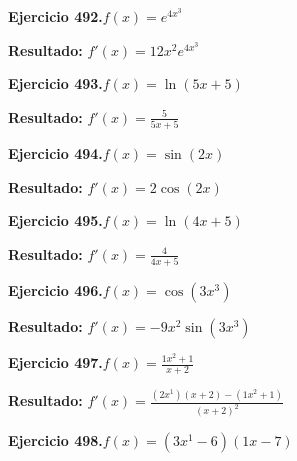 \documentclass[10pt,a4paper]{article}
\begin{document}
\begin{ejbox}
\textbf{Ejercicio 492.}\quad $f(x) = e^{4x^{3}}$
\end{ejbox}

\begin{solbox}
\textbf{Resultado:} \(\displaystyle f'(x) = 12x^{2}e^{4x^{3}}\)
\end{solbox}

\newpage
\begin{ejbox}
\textbf{Ejercicio 493.}\quad $f(x) = \ln(5x + 5)$
\end{ejbox}

\begin{solbox}
\textbf{Resultado:} \(\displaystyle f'(x) = \frac{5}{5x + 5}\)
\end{solbox}

\begin{ejbox}
\textbf{Ejercicio 494.}\quad $f(x) = \sin(2x)$
\end{ejbox}

\begin{solbox}
\textbf{Resultado:} \(\displaystyle f'(x) = 2\cos(2x)\)
\end{solbox}

\begin{ejbox}
\textbf{Ejercicio 495.}\quad $f(x) = \ln(4x + 5)$
\end{ejbox}

\begin{solbox}
\textbf{Resultado:} \(\displaystyle f'(x) = \frac{4}{4x + 5}\)
\end{solbox}

\newpage
\begin{ejbox}
\textbf{Ejercicio 496.}\quad $f(x) = \cos(3x^{3})$
\end{ejbox}

\begin{solbox}
\textbf{Resultado:} \(\displaystyle f'(x) = -9x^{2}\sin(3x^{3})\)
\end{solbox}

\begin{ejbox}
\textbf{Ejercicio 497.}\quad $f(x) = \frac{1x^{2} +1}{x + 2}$
\end{ejbox}

\begin{solbox}
\textbf{Resultado:} \(\displaystyle f'(x) = \frac{(2x^{1})(x+2) - (1x^{2} +1)}{(x+2)^2}\)
\end{solbox}

\begin{ejbox}
\textbf{Ejercicio 498.}\quad $f(x) = (3x^{1} -6)(1x -7)$
\end{ejbox}
\end{document}
